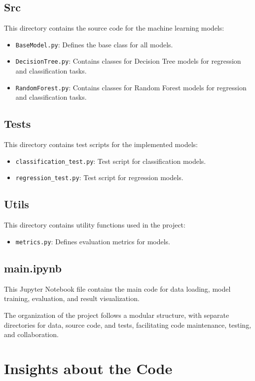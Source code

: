 \documentclass{ufazreport}
\begin{document}
\subsection{Src}
This directory contains the source code for the machine learning models:
\begin{itemize}
    \item \texttt{BaseModel.py}: Defines the base class for all models.
    \item \texttt{DecisionTree.py}: Contains classes for Decision Tree models for regression and classification tasks.
    \item \texttt{RandomForest.py}: Contains classes for Random Forest models for regression and classification tasks.
\end{itemize}

\subsection{Tests}
This directory contains test scripts for the implemented models:
\begin{itemize}
    \item \texttt{classification\_test.py}: Test script for classification models.
    \item \texttt{regression\_test.py}: Test script for regression models.
\end{itemize}

\subsection{Utils}
This directory contains utility functions used in the project:
\begin{itemize}
    \item \texttt{metrics.py}: Defines evaluation metrics for models.
\end{itemize}


\subsection{main.ipynb}
This Jupyter Notebook file contains the main code for data loading, model training, evaluation, and result visualization.

The organization of the project follows a modular structure, with separate directories for data, source code, and tests, facilitating code maintenance, testing, and collaboration.

\section{Insights about the Code}
\end{document}
